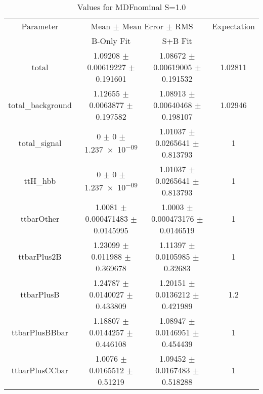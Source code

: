 \begin{table}
\centering
\caption{Values for MDFnominal S=1.0}
\begin{tabular}{cccc}
\toprule
Parameter & \multicolumn{2}{c}{Mean $\pm$ Mean Error $\pm$ RMS} & Expectation\\
 & B-Only Fit & S+B Fit & \\
\midrule
total & \num{1.09208} $\pm$ \num{0.00619227} $\pm$ \num{0.191601} & \num{1.08672} $\pm$ \num{0.00619005} $\pm$ \num{0.191532} & \num{1.02811}\\
total\_background & \num{1.12655} $\pm$ \num{0.0063877} $\pm$ \num{0.197582} & \num{1.08913} $\pm$ \num{0.00640468} $\pm$ \num{0.198107} & \num{1.02946}\\
total\_signal & \num{0} $\pm$ \num{0} $\pm$ \num{1.237e-09} & \num{1.01037} $\pm$ \num{0.0265641} $\pm$ \num{0.813793} & \num{1}\\
ttH\_hbb & \num{0} $\pm$ \num{0} $\pm$ \num{1.237e-09} & \num{1.01037} $\pm$ \num{0.0265641} $\pm$ \num{0.813793} & \num{1}\\
ttbarOther & \num{1.0081} $\pm$ \num{0.000471483} $\pm$ \num{0.0145995} & \num{1.0003} $\pm$ \num{0.000473176} $\pm$ \num{0.0146519} & \num{1}\\
ttbarPlus2B & \num{1.23099} $\pm$ \num{0.011988} $\pm$ \num{0.369678} & \num{1.11397} $\pm$ \num{0.0105985} $\pm$ \num{0.32683} & \num{1}\\
ttbarPlusB & \num{1.24787} $\pm$ \num{0.0140027} $\pm$ \num{0.433809} & \num{1.20151} $\pm$ \num{0.0136212} $\pm$ \num{0.421989} & \num{1.2}\\
ttbarPlusBBbar & \num{1.18807} $\pm$ \num{0.0144257} $\pm$ \num{0.446108} & \num{1.08947} $\pm$ \num{0.0146951} $\pm$ \num{0.454439} & \num{1}\\
ttbarPlusCCbar & \num{1.0076} $\pm$ \num{0.0165512} $\pm$ \num{0.51219} & \num{1.09452} $\pm$ \num{0.0167483} $\pm$ \num{0.518288} & \num{1}\\
\bottomrule
\end{tabular}
\end{table}